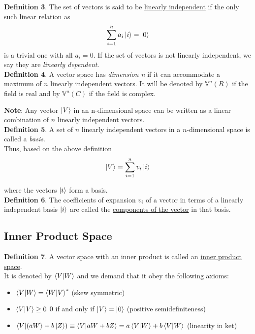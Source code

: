 \documentclass{article}
\begin{document}
\textbf{Definition 3}. The set of vectors is said to be \underline{linearly independent} if the only such linear relation as 
\begin{equation}
\sum_{i=1}^{n} a_{i}\ket{i} = \ket{0}    
\end{equation}
is a trivial one with all $a_{i} = 0$. If the set of vectors is not linearly independent, we say they are \textit{linearly dependent}.\\

\textbf{Definition 4}. A vector space has \textit{dimension n} if it can accommodate a maximum of $n$ linearly independent vectors. It will be denoted by $\mathbb{V}^{n}(R)$ if the field is real and by $\mathbb{V}^{n}(C)$ if the field is complex.

\textbf{Note}: Any vector $\ket{V}$ in an n-dimensional space can be written as a linear combination of $n$
linearly independent vectors.\\

\textbf{Definition 5}. A set of $n$ linearly independent vectors in a $n$-dimensional space is called a \textit{basis}.\\
Thus, based on the above definition
\begin{equation}
    \ket{V} = \sum_{i=1}^{n}v_{i}\ket{i}
\end{equation}

where the vectors $\ket{i}$ form a basis.\\

\textbf{Definition 6}. The coefficients of expansion $v_{i}$ of a vector in terms of a linearly independent basis $\ket{i}$ are called the \underline{components of the vector} in that basis.

\subsection{Inner Product Space}
\label{subsec:Inner Product Space}

\textbf{Definition 7}. A vector space with an inner product is called an \underline{inner product space}.\\
It is denoted by $\braket{V}{W}$ and we demand that it obey the following axioms:
\begin{itemize}
    \item $\braket{V}{W} = \braket{W}{V}^{*}$ (skew symmetric)
    \item $\braket{V}{V} \geq 0$ $0$ if and only if $\ket{V} = \ket{0}$ (positive semidefiniteness)
    \item $\bra{V}\ket{(aW} + b\ket{Z}) \equiv \braket{V}{aW+bZ} = a\braket{V}{W}+b\braket{V}{W}$ (linearity in ket)
\end{itemize}
\end{document}
